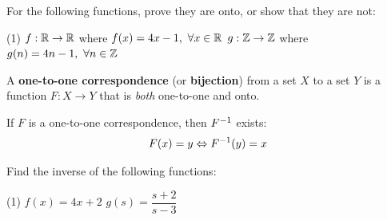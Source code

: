 \documentclass[../mathNotesPreamble]{subfiles}
\begin{document}
  \begin{ex*}
    For the following functions, prove they are onto, or show that they are not:
    \begin{extasks}[after-item-skip=\stretch{1}](1)
      \task $f:\mathbb{R} \to \mathbb{R}$ where $f(x)=4x-1,\ \forall x\in \mathbb{R}$
      \task $g:\mathbb{Z} \to \mathbb{Z}$ where $g(n)=4n-1,\ \forall n\in \mathbb{Z}$
    \end{extasks}
  \end{ex*}
  \pagebreak

  \begin{defn*}
    A \textbf{one-to-one correspondence} (or \textbf{bijection}) from a set $X$ to a set $Y$ is a function $F:X\to Y$ that is \emph{both} one-to-one and onto.
    \vspace*{\baselineskip}

    If $F$ is a one-to-one correspondence, then $F^{-1}$ exists:
      \[F(x)=y \Leftrightarrow F^{-1}(y)=x\]
  \end{defn*}
  \begin{ex*}
    Find the inverse of the following functions:
    \begin{extasks}[after-item-skip=\stretch{1}](1)
      \task $f(x)=4x+2$
      \task $g(s)=\dfrac{s+2}{s-3}$
    \end{extasks}
  \end{ex*}

  \pagebreak
\end{document}
